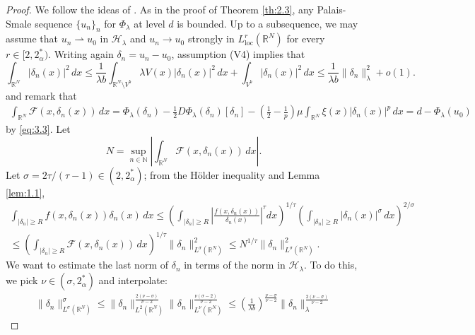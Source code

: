 \documentclass[11pt]{amsart}
\numberwithin{equation}{section}
\theoremstyle{remark}
\theoremstyle{definition}
\begin{document}
\begin{proof}
We follow the ideas of \cite{MR2321894}. As in the proof of Theorem \ref{th:2.3}, any Palais-Smale sequence $\{u_n\}_n$ for $\Phi_\lambda$ at level $d$ is bounded. Up to a subsequence, we may assume that $u_n \rightharpoonup u_0$ in $\mathscr{H}_\lambda$ and $u_n \to u_0$ strongly in $L^r_{\mathrm{loc}}(\mathbb{R}^N)$ for every $r \in [2,2_\alpha^*)$. Writing again $\delta_n = u_n-u_0$, assumption (V4) implies that
\begin{equation} \label{eq:3.10}
\int_{\mathbb{R}^N} |\delta_n(x)|^2 \, dx \leqslant \frac{1}{\lambda b} \int_{\mathbb{R}^N \setminus V^b} \lambda V(x) |\delta_n(x)|^2 \, dx + \int_{V^b} |\delta_n(x)|^2 \, dx \leqslant \frac{1}{\lambda b} \| \delta_n\|^2_{\lambda} + o(1).
\end{equation}
and remark that 
\begin{align*}
 \int_{\mathbb{R}^N} \mathscr{F}(x,\delta_n(x)) \, dx 
 = \Phi_\lambda(\delta_n) - \frac{1}{2} D\Phi_\lambda(\delta_n)[\delta_n] - \left( \frac{1}{2} - \frac{1}{p} \right) \mu \int_{\mathbb{R}^N} \xi(x) |\delta_n(x)|^p \, dx = d - \Phi_\lambda(u_0)
\end{align*}
by \eqref{eq:3.3}. Let
\[
N = \sup_{n \in \mathbb{N}} \left| \int_{\mathbb{R}^N} \mathscr{F}(x,\delta_n(x)) \, dx \right|.
\]
 Let \(\sigma = 2\tau / (\tau-1) \in (2,2_\alpha^*)\); from the H\"{o}lder inequality and Lemma \ref{lem:1.1},
\begin{multline}\label{eq:3.12}
\int_{|\delta_n| \geqslant R} f(x,\delta_n(x)) \delta_n(x) \, dx \leqslant \left(
\int_{|\delta_n| \geqslant R} \left| \frac{f(x,\delta_n(x))}{\delta_n(x)} \right|^\tau dx 
\right)^{1/\tau}
\left(
\int_{|\delta_n| \geqslant R} |\delta_n(x)|^\sigma \, dx
\right)^{2/\sigma} \\
\leqslant
\left(
\int_{|\delta_n| \geqslant R} \mathscr{F}(x,\delta_n(x)) \, dx
\right)^{1/\tau} \|\delta_n\|_{L^\sigma(\mathbb{R}^N)}^2
\leqslant N^{1/\tau} \|\delta_n\|_{L^\sigma(\mathbb{R}^N)}^2.
\end{multline}
We want to estimate the last norm of $\delta_n$ in terms of the norm in $\mathscr{H}_\lambda$. To do this, we pick $\nu \in (\sigma,2_\alpha^*)$ and interpolate:
\begin{multline*}
\|\delta_n\|_{L^\sigma(\mathbb{R}^N)}^\sigma \leqslant \|\delta_n\|_{L^2(\mathbb{R}^N)}^{\frac{2(\nu-\sigma)}{\nu-2}} \|\delta_n\|_{L^\nu(\mathbb{R}^N)}^{\frac{\nu (\sigma-2)}{\nu-2}}
\leqslant \left( \frac{1}{\lambda b} \right)^{\frac{\nu-\sigma}{\nu -2}} \|\delta_n\|_\lambda^{\frac{2(\nu-\sigma)}{\nu-2}}

\end{multline*}
\end{proof}
\end{document}
